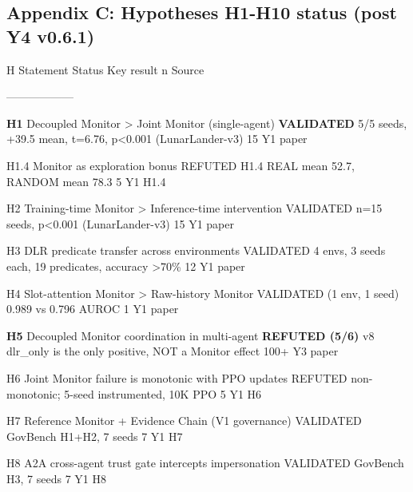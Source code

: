 \documentclass[11pt]{article}
\begin{document}
\subsection{Appendix C: Hypotheses H1-H10 status (post Y4
v0.6.1)}\label{appendix-c-hypotheses-h1-h10-status-post-y4-v0.6.1}

H \textbar{} Statement \textbar{} Status \textbar{} Key result
\textbar{} n \textbar{} Source \textbar{}

\textbar---\textbar---\textbar---\textbar---\textbar---\textbar---\textbar{}

\textbf{H1} \textbar{} Decoupled Monitor \textgreater{} Joint Monitor
(single-agent) \textbar{} \textbf{VALIDATED} \textbar{} 5/5 seeds, +39.5
mean, t=6.76, p\textless0.001 (LunarLander-v3) \textbar{} 15 \textbar{}
Y1 paper \textbar{}

H1.4 \textbar{} Monitor as exploration bonus \textbar{} REFUTED
\textbar{} H1.4 REAL mean 52.7, RANDOM mean 78.3 \textbar{} 5 \textbar{}
Y1 H1.4 \textbar{}

H2 \textbar{} Training-time Monitor \textgreater{} Inference-time
intervention \textbar{} VALIDATED \textbar{} n=15 seeds, p\textless0.001
(LunarLander-v3) \textbar{} 15 \textbar{} Y1 paper \textbar{}

H3 \textbar{} DLR predicate transfer across environments \textbar{}
VALIDATED \textbar{} 4 envs, 3 seeds each, 19 predicates, accuracy
\textgreater70\% \textbar{} 12 \textbar{} Y1 paper \textbar{}

H4 \textbar{} Slot-attention Monitor \textgreater{} Raw-history Monitor
\textbar{} VALIDATED (1 env, 1 seed) \textbar{} 0.989 vs 0.796 AUROC
\textbar{} 1 \textbar{} Y1 paper \textbar{}

\textbf{H5} \textbar{} Decoupled Monitor coordination in multi-agent
\textbar{} \textbf{REFUTED (5/6)} \textbar{} v8 dlr\_only is the only
positive, NOT a Monitor effect \textbar{} 100+ \textbar{} Y3 paper
\textbar{}

H6 \textbar{} Joint Monitor failure is monotonic with PPO updates
\textbar{} REFUTED \textbar{} non-monotonic; 5-seed instrumented, 10K
PPO \textbar{} 5 \textbar{} Y1 H6 \textbar{}

H7 \textbar{} Reference Monitor + Evidence Chain (V1 governance)
\textbar{} VALIDATED \textbar{} GovBench H1+H2, 7 seeds \textbar{} 7
\textbar{} Y1 H7 \textbar{}

H8 \textbar{} A2A cross-agent trust gate intercepts impersonation
\textbar{} VALIDATED \textbar{} GovBench H3, 7 seeds \textbar{} 7
\textbar{} Y1 H8 \textbar{}
\end{document}
